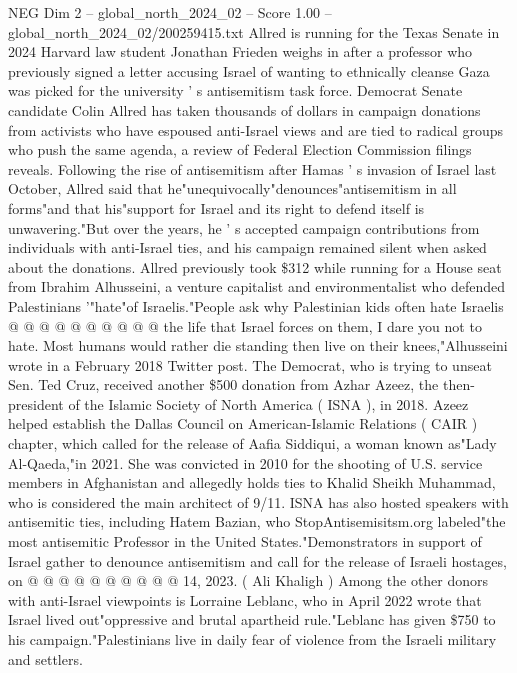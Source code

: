 \begin{textsample}{NEG Dim 2 – global\_north\_2024\_02 – Score 1.00 – global\_north\_2024\_02/200259415.txt}  \label{ex:f2_neg_303}
Allred is running for the Texas Senate in 2024 Harvard law student Jonathan Frieden weighs in after a professor who previously signed a letter accusing Israel of wanting to ethnically cleanse Gaza was picked for the university ' s antisemitism task force.
Democrat Senate candidate Colin Allred has taken thousands of dollars in campaign donations from activists who have espoused anti-Israel views and are tied to radical groups who push the same agenda, a review of Federal Election Commission filings reveals.
Following the rise of antisemitism after Hamas ' s invasion of Israel last October, Allred said that he"unequivocally"denounces"antisemitism in all forms"and that his"support for Israel and its right to defend itself is unwavering."But over the years, he ' s accepted campaign contributions from individuals with anti-Israel ties, and his campaign remained silent when asked about the donations.
Allred previously took \$312 while running for a House seat from Ibrahim Alhusseini, a venture capitalist and environmentalist who defended Palestinians '"hate"of Israelis."People ask why Palestinian kids often hate Israelis @ @ @ @ @ @ @ @ @ @ the life that Israel forces on them, I dare you not to hate.
Most humans would rather die standing then live on their knees,"Alhusseini wrote in a February 2018 Twitter post.
The Democrat, who is trying to unseat Sen.
Ted Cruz, received another \$500 donation from Azhar Azeez, the then-president of the Islamic Society of North America ( ISNA ), in 2018.
Azeez helped establish the Dallas Council on American-Islamic Relations ( CAIR ) chapter, which called for the release of Aafia Siddiqui, a woman known as"Lady Al-Qaeda,"in 2021.
She was convicted in 2010 for the shooting of U.S. service members in Afghanistan and allegedly holds ties to Khalid Sheikh Muhammad, who is considered the main architect of 9/11.
ISNA has also hosted speakers with antisemitic ties, including Hatem Bazian, who StopAntisemisitsm.org labeled"the most antisemitic Professor in the United States."Demonstrators in support of Israel gather to denounce antisemitism and call for the release of Israeli hostages, on @ @ @ @ @ @ @ @ @ @ 14, 2023. ( Ali Khaligh ) Among the other donors with anti-Israel viewpoints is Lorraine Leblanc, who in April 2022 wrote that Israel lived out"oppressive and brutal apartheid rule."Leblanc has given \$750 to his campaign."Palestinians live in daily fear of violence from the Israeli military and settlers.

\end{textsample}
